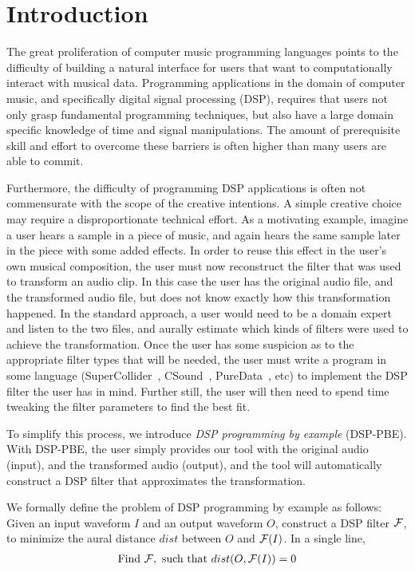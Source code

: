 \section{Introduction}

The great proliferation of computer music programming languages points to the difficulty of building a natural interface for users that want to computationally interact with musical data.
Programming applications in the domain of computer music, and specifically digital signal processing (DSP), requires that users not only grasp fundamental programming techniques, but also have a large domain specific knowledge of time and signal manipulations.
The amount of prerequisite skill and effort to overcome these barriers is often higher than many users are able to commit.

Furthermore, the difficulty of programming DSP applications is often not commensurate with the scope of the creative intentions.
A simple creative choice may require a disproportionate technical effort.
As a motivating example, imagine a user hears a sample in a piece of music, and again hears the same sample later in the piece with some added effects.
In order to reuse this effect in the user's own musical composition, the user must now reconstruct the filter that was used to transform an audio clip. 
In this case the user has the original audio file, and the transformed audio file, but does not know exactly how this transformation happened.
In the standard approach, a user would need to be a domain expert and listen to the two files, and aurally estimate which kinds of filters were used to achieve the transformation. 
Once the user has some suspicion as to the appropriate filter types that will be needed, the user must write a program in some language (SuperCollider~\cite{supercollider}, CSound~\cite{csound}, PureData~\cite{puredata}, etc) to implement the DSP filter the user has in mind. 
Further still, the user will then need to spend time tweaking the filter parameters to find the best fit. 


To simplify this process, we introduce \textit{DSP programming by example} (DSP-PBE). 
With DSP-PBE, the user simply provides our tool with the original audio (input), and the transformed audio (output), and the tool will automatically construct a DSP filter that approximates the transformation.

We formally define the problem of DSP programming by example as follows:
Given an input waveform $I$ and an output waveform $O$, construct a DSP filter $\mathcal{F}$, to minimize the aural distance $dist$ between $O$ and $\mathcal{F}(I)$.
In a single line,  
%
\begin{align*}
\text{Find } \mathcal{F}, \text{ such that } dist(O,\mathcal{F}(I))=0
\end{align*}


